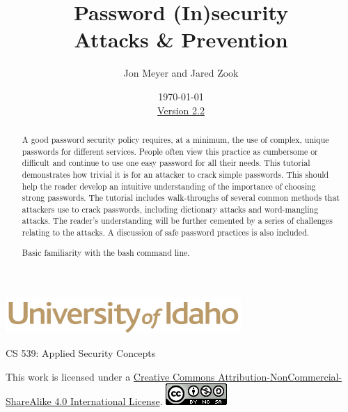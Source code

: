 \documentclass[12pt]{extarticle}
\begin{document}
\title{ Password (In)security \\ \large Attacks \& Prevention}
\author{Jon Meyer and Jared Zook}
\date{\today \\ \hyperref[changelog]{Version 2.2} }
\renewcommand{\abstractname}{Summary}
\begin{titlepage}
\maketitle
{}
\begin{center}
\includegraphics[scale=.5]{UofI}

\large{CS 539: Applied Security Concepts}

\vskip 40pt

\end{center}

\begin{abstract}
A good password security policy requires, at a minimum, the use of complex, unique passwords for different services. People often view this practice as cumbersome or difficult and continue to use one easy password for all their needs. This tutorial demonstrates how trivial it is for an attacker to crack simple passwords. This should help the reader develop an intuitive understanding of the importance of choosing strong passwords. The tutorial includes walk-throughs of several common methods that attackers use to crack passwords, including dictionary attacks and word-mangling attacks. The reader's understanding will be further cemented by a series of challenges relating to the attacks. A discussion of safe password practices is also included.


Basic familiarity with the bash command line.
\end{abstract}


\vfill
\begin{center}
This work is licensed under a \href{https://creativecommons.org/licenses/by-nc-sa/4.0/legalcode}{Creative Commons Attribution-NonCommercial-ShareAlike 4.0 International License}.
\vskip 10pt
\includegraphics[scale=.5]{cc}
\end{center}

\end{titlepage}
\end{document}
